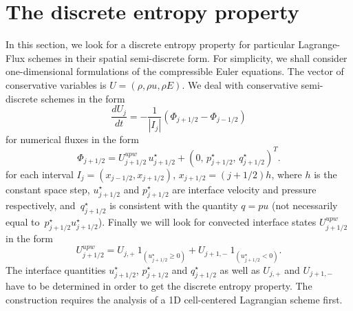 \documentclass[graybox]{svmult}
\newcommand{\ps}{p_{j+1/2}^\star}
\newcommand{\us}{u_{j+1/2}^\star}
\newcommand{\qs}{q_{j+1/2}^\star}
\begin{document}
\section{The discrete entropy property}
%
In this section, we look for a discrete entropy property for particular Lagrange-Flux schemes
in their spatial semi-discrete form. For simplicity, we shall consider one-dimensional
formulations of the compressible Euler equations. The vector of conservative variables is $U=(\rho,\rho u,\rho E)$. We deal with conservative semi-discrete schemes in the form
%
\begin{equation}
\frac{dU_j}{dt} = -\frac{1}{|I_j|} \left( \Phi_{j+1/2} - \Phi_{j-1/2} \right)
\label{eq:fvm}
\end{equation}
%
for numerical fluxes in the form
%
\begin{equation}
\Phi_{j+1/2} =  U_{j+1/2}^{upw}\, \us + (0,\, \ps,\, \qs)^T.
\label{eq:phi}
\end{equation}
%
for each interval $I_j=(x_{j-1/2},x_{j+1/2})$, $x_{j+1/2}=(j+1/2)h$, where $h$ is the constant
space step, $\us$ and $\ps$ are interface velocity and pressure respectively, 
and~$\qs$ is consistent with the quantity $q=pu$ (not necessarily equal to~$\ps\us$).
Finally we will look for convected interface states $U_{j+1/2}^{upw}$ in the form
\[
U_{j+1/2}^{upw} = U_{j,+}\ 1_{(\us\geq 0)} + U_{j+1,-}\ 1_{(\us< 0)}.
\]
%
The interface quantities $\us$, $\ps$ and $\qs$ as well as $U_{j,+}$ and $U_{j+1,-}$  have to be determined in order to get the discrete entropy property.
The construction requires the analysis of a 1D cell-centered Lagrangian scheme first.
%
\vspace{-0.5cm}
\end{document}
